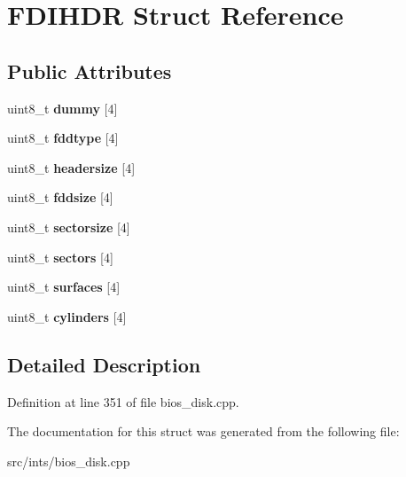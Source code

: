 \hypertarget{structFDIHDR}{\section{F\-D\-I\-H\-D\-R Struct Reference}
\label{structFDIHDR}
}
\subsection*{Public Attributes}
\begin{DoxyCompactItemize}
\item 
\hypertarget{structFDIHDR_a1c884cddb02c6661d8fc9f192b3fc22f}{uint8\-\_\-t {\bfseries dummy} \mbox{[}4\mbox{]}}\label{structFDIHDR_a1c884cddb02c6661d8fc9f192b3fc22f}

\item 
\hypertarget{structFDIHDR_a47545c8404b2ae2f8377e1bcc02fc8f0}{uint8\-\_\-t {\bfseries fddtype} \mbox{[}4\mbox{]}}\label{structFDIHDR_a47545c8404b2ae2f8377e1bcc02fc8f0}

\item 
\hypertarget{structFDIHDR_a09132fda6189c6cec4e4aa2d05868174}{uint8\-\_\-t {\bfseries headersize} \mbox{[}4\mbox{]}}\label{structFDIHDR_a09132fda6189c6cec4e4aa2d05868174}

\item 
\hypertarget{structFDIHDR_a0bc19446daf786a86e01fdfd0f396438}{uint8\-\_\-t {\bfseries fddsize} \mbox{[}4\mbox{]}}\label{structFDIHDR_a0bc19446daf786a86e01fdfd0f396438}

\item 
\hypertarget{structFDIHDR_ac0d70ea816470f23818e513aec16187a}{uint8\-\_\-t {\bfseries sectorsize} \mbox{[}4\mbox{]}}\label{structFDIHDR_ac0d70ea816470f23818e513aec16187a}

\item 
\hypertarget{structFDIHDR_a8df34ba3a180f2c436938eef65b1dd83}{uint8\-\_\-t {\bfseries sectors} \mbox{[}4\mbox{]}}\label{structFDIHDR_a8df34ba3a180f2c436938eef65b1dd83}

\item 
\hypertarget{structFDIHDR_a0075a0f7719ce25a93642b9db90d5000}{uint8\-\_\-t {\bfseries surfaces} \mbox{[}4\mbox{]}}\label{structFDIHDR_a0075a0f7719ce25a93642b9db90d5000}

\item 
\hypertarget{structFDIHDR_aed3de62f3b389214c84acec24434a0ee}{uint8\-\_\-t {\bfseries cylinders} \mbox{[}4\mbox{]}}\label{structFDIHDR_aed3de62f3b389214c84acec24434a0ee}

\end{DoxyCompactItemize}


\subsection{Detailed Description}


Definition at line 351 of file bios\-\_\-disk.\-cpp.



The documentation for this struct was generated from the following file\-:\begin{DoxyCompactItemize}
\item 
src/ints/bios\-\_\-disk.\-cpp\end{DoxyCompactItemize}
